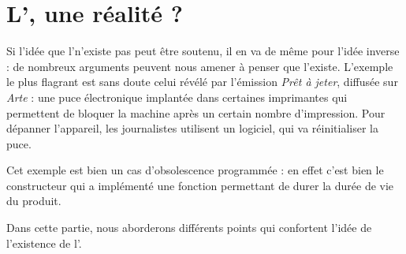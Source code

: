 \section{L'\op, une réalité ?}

Si l'idée que l'\op n'existe pas peut être soutenu, il en va de même pour l'idée inverse : de nombreux arguments peuvent nous amener à penser que l'\op existe.
\smallbreak
L'exemple le plus flagrant est sans doute celui révélé par l'émission  \textit{Prêt à jeter}, diffusée sur \textit{Arte} : une puce électronique implantée dans certaines imprimantes qui permettent de bloquer la machine après un certain nombre d'impression. Pour dépanner l'appareil, les journalistes utilisent un logiciel, qui va réinitialiser la puce. 

Cet exemple est bien un cas d'obsolescence programmée : en effet c'est bien le constructeur qui a implémenté une fonction permettant de durer la durée de vie du produit. 

\smallbreak

Dans cette partie, nous aborderons différents points qui confortent l'idée de l’existence de l'\op.
